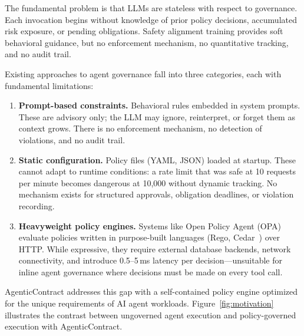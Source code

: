 \documentclass[10pt, twocolumn]{article}
\begin{document}
The fundamental problem is that LLMs are stateless with respect to governance. Each invocation begins without knowledge of prior policy decisions, accumulated risk exposure, or pending obligations. Safety alignment training provides soft behavioral guidance, but no enforcement mechanism, no quantitative tracking, and no audit trail.

Existing approaches to agent governance fall into three categories, each with fundamental limitations:

\begin{enumerate}[nosep, leftmargin=*]
  \item \textbf{Prompt-based constraints.} Behavioral rules embedded in system prompts. These are advisory only; the LLM may ignore, reinterpret, or forget them as context grows. There is no enforcement mechanism, no detection of violations, and no audit trail.
  \item \textbf{Static configuration.} Policy files (YAML, JSON) loaded at startup. These cannot adapt to runtime conditions: a rate limit that was safe at 10 requests per minute becomes dangerous at 10{,}000 without dynamic tracking. No mechanism exists for structured approvals, obligation deadlines, or violation recording.
  \item \textbf{Heavyweight policy engines.} Systems like Open Policy Agent (OPA)~\cite{opa2018} evaluate policies written in purpose-built languages (Rego, Cedar~\cite{cedar2023}) over HTTP. While expressive, they require external database backends, network connectivity, and introduce 0.5--5\,ms latency per decision---unsuitable for inline agent governance where decisions must be made on every tool call.
\end{enumerate}

AgenticContract addresses this gap with a self-contained policy engine optimized for the unique requirements of AI agent workloads. Figure~\ref{fig:motivation} illustrates the contrast between ungoverned agent execution and policy-governed execution with AgenticContract.
\end{document}
